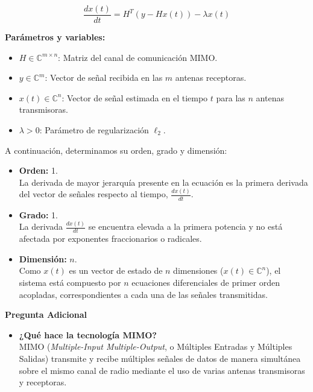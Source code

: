 \begin{enumerate}[label=\arabic*., leftmargin=*]
    \[ \frac{dx(t)}{dt} = H^T (y - H x(t)) - \lambda x(t) \]

    \textbf{Parámetros y variables:}
    \begin{itemize}[leftmargin=*]
        \item $H \in \mathbb{C}^{m \times n}$: Matriz del canal de comunicación MIMO.
        \item $y \in \mathbb{C}^m$: Vector de señal recibida en las $m$ antenas receptoras.
        \item $x(t) \in \mathbb{C}^n$: Vector de señal estimada en el tiempo $t$ para las $n$ antenas transmisoras.
        \item $\lambda > 0$: Parámetro de regularización $\ell_2$.
    \end{itemize}

    A continuación, determinamos su orden, grado y dimensión:

    \begin{itemize}[leftmargin=*]
        \item \textbf{Orden:} 1.\\
        La derivada de mayor jerarquía presente en la ecuación es la primera derivada del vector de señales respecto al tiempo, $\frac{dx(t)}{dt}$.

        \item \textbf{Grado:} 1.\\
        La derivada $\frac{dx(t)}{dt}$ se encuentra elevada a la primera potencia y no está afectada por exponentes fraccionarios o radicales.

        \item \textbf{Dimensión:} $n$.\\
        Como $x(t)$ es un vector de estado de $n$ dimensiones ($x(t) \in \mathbb{C}^n$), el sistema está compuesto por $n$ ecuaciones diferenciales de primer orden acopladas, correspondientes a cada una de las señales transmitidas.
    \end{itemize}

    \textbf{Pregunta Adicional}

    \begin{itemize}[leftmargin=*]
        \item \textbf{¿Qué hace la tecnología MIMO?}\\
        MIMO (\textit{Multiple-Input Multiple-Output}, o Múltiples Entradas y Múltiples Salidas) transmite y recibe múltiples señales de datos de manera simultánea sobre el mismo canal de radio mediante el uso de varias antenas transmisoras y receptoras.
        

\end{itemize}
\end{enumerate}
